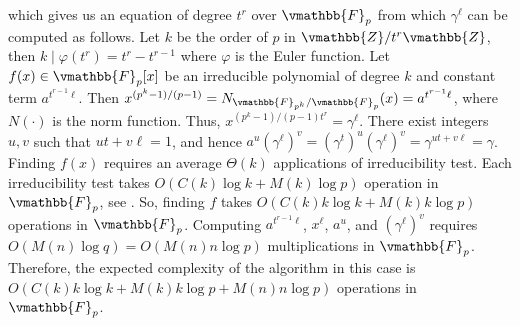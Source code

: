 which gives us an equation of degree $t^r$ over $\vmathbb{F}_p$ from which $\gamma^\ell$ can be 
computed as follows. Let $k$ be the order of $p$ in $\vmathbb{Z}/t^r\vmathbb{Z}$, then $k \mid 
\varphi(t^r) = t^r - t^{r - 1}$ where $\varphi$ is the Euler function. Let $f(x) \in 
\vmathbb{F}_p[x]$ be an irreducible polynomial of degree $k$ and constant term $a^{t^{r - 1}\ell}$. 
Then $x^{(p^k - 1) / (p - 1)} = N_{\vmathbb{F}_{p^k}/\vmathbb{F}_p}(x) = a^{t^{r - 1}\ell}$, where 
$N(\cdot)$ is the norm function. Thus, $x^{(p^k - 1) / (p - 1)t^r} = \gamma^\ell$. There exist 
integers $u, v$ such that $ut + v\ell = 1$, and hence $a^u(\gamma^\ell)^v = 
(\gamma^t)^u(\gamma^\ell)^v = \gamma^{ut + v\ell} = \gamma$. Finding $f(x)$ requires an average 
$\Theta(k)$ applications of irreducibility test. Each irreducibility test takes $O(C(k)\log k + 
M(k)\log p)$ operation in $\vmathbb{F}_p$, see \cite{Shoup1994}. So, finding $f$ takes $O(C(k)k\log k 
+ M(k)k\log p)$ operations in $\vmathbb{F}_p$. Computing $a^{t^{r - 1}\ell}$, $x^\ell$, $a^u$, and 
$(\gamma^\ell)^v$ requires $O(M(n)\log q) = O(M(n)n\log p)$ multiplications in $\vmathbb{F}_p$. 
Therefore, the expected complexity of the algorithm in this case is $O(C(k)k\log k + M(k)k\log p + 
M(n)n\log p)$ operations in $\vmathbb{F}_p$. 